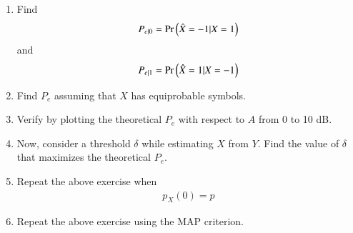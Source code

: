 \documentclass[journal,12pt,twocolumn]{IEEEtran}
\renewcommand\thesection{\arabic{section}}
\begin{document}
\begin{enumerate}[label=\thesection.\arabic*
        ,ref=\thesection.\theenumi]
    \item
          \label{ml-ch4_sim}
          Find
          \begin{equation}
              P_{e|0} = \Pr\left(\hat{X} = -1|X=1\right)
          \end{equation}
          and
          \begin{equation}
              P_{e|1} = \Pr\left(\hat{X} = 1|X=-1\right)
          \end{equation}
    \item Find $P_e$ assuming that $X$ has equiprobable symbols.
    \item
          Verify by plotting  the theoretical $P_e$ with respect to $A$ from 0 to 10 dB.
    \item Now, consider a threshold $\delta$  while estimating $X$ from $Y$. Find the value of $\delta$ that maximizes the theoretical $P_e$.
    \item Repeat the above exercise when
          \begin{align}
              p_{X}(0) = p
          \end{align}
    \item Repeat the above exercise using the MAP criterion.
\end{enumerate}
\end{document}
